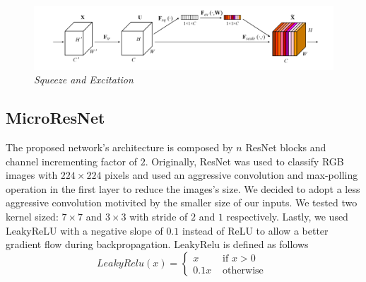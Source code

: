 \documentclass[../document.tex]{subfiles}
\begin{document}
\begin{figure}[htbp]
    \centering
    \includegraphics[width=\linewidth]{../img/implementation/estimator/se.png}
    \caption{\emph{Squeeze and Excitation} \cite{hu2017squeeze}}
\end{figure}
\subsection{MicroResNet}
\label{subsec : micro-resnets}
The proposed network's architecture is composed by $n$ ResNet blocks and channel incrementing factor of $2$. Originally, ResNet was used to classify RGB images with $224\times224$ pixels and  used an aggressive convolution and max-polling operation in the first layer to reduce the images's size. We decided to adopt a less aggressive convolution motivited by the smaller size of our inputs. We tested two kernel sized: $7\times7$ and $3\times3$ with stride of $2$ and $1$ respectively. Lastly, we used LeakyReLU \cite{leakyrelu} with a negative slope of $0.1$ instead of ReLU to allow a better gradient flow during backpropagation. LeakyRelu is defined as follows
\begin{equation}
LeakyRelu(x)=\left\{\begin{array}{ll}{x} & {\text { if } x>0} \\ {0.1 x} & {\text { otherwise }}\end{array}\right.
\end{equation}
\end{document}
